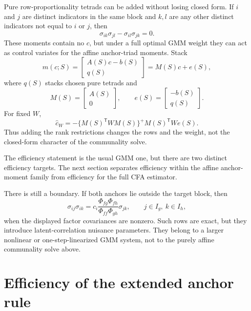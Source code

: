 \documentclass[11pt]{article}
\newcommand{\T}{^{\mathsf T}}
\theoremstyle{plain}
\theoremstyle{remark}
\begin{document}
Pure row-proportionality tetrads can be added without losing closed form. If
\(i\) and \(j\) are distinct indicators in the same block and \(k,l\) are any
other distinct indicators not equal to \(i\) or \(j\), then
\begin{equation}\label{eq:pure-row-tetrad}
  \sigma_{ik}\sigma_{jl}-\sigma_{il}\sigma_{jk}=0 .
\end{equation}
These moments contain no \(c\), but under a full optimal GMM weight they can act
as control variates for the affine anchor-triad moments. Stack
\[
  m(c;S)=
  \begin{bmatrix}
    A(S)c-b(S)\\
    q(S)
  \end{bmatrix}
  =
  M(S)c+e(S),
\]
where \(q(S)\) stacks chosen pure tetrads and
\[
  M(S)=
  \begin{bmatrix}
    A(S)\\
    0
  \end{bmatrix},
  \qquad
  e(S)=
  \begin{bmatrix}
    -b(S)\\
    q(S)
  \end{bmatrix}.
\]
For fixed \(W\),
\begin{equation}\label{eq:affine-gmm-solve}
  \hat c_W
  =
  -\{M(S)\T W M(S)\}^{+}M(S)\T W e(S).
\end{equation}
Thus adding the rank restrictions changes the rows and the weight, not the
closed-form character of the communality solve.

The efficiency statement is the usual GMM one, but there are two distinct
efficiency targets. The next section separates efficiency within the affine
anchor-moment family from efficiency for the full CFA estimator.

There is still a boundary. If both anchors lie outside the target block, then
\[
  \sigma_{ij}\sigma_{ik}
  =
  c_i
  \frac{\Phi_{fg}\Phi_{fh}}{\Phi_{ff}\Phi_{gh}}
  \sigma_{jk},
  \qquad j\in I_g,\ k\in I_h ,
\]
when the displayed factor covariances are nonzero. Such rows are exact, but
they introduce latent-correlation nuisance parameters. They belong to a larger
nonlinear or one-step-linearized GMM system, not to the purely affine
communality solve above.

\section{Efficiency of the extended anchor rule}
\end{document}
